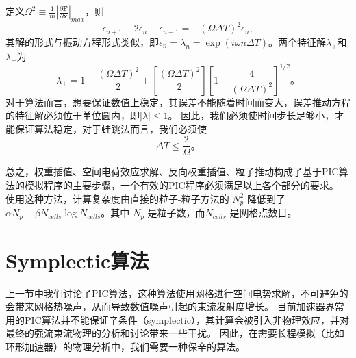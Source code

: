 {\begin{equation}
      \end{equation}
定义$\Omega^2 \equiv \frac{1}{m} \left| \frac{\partial\mathbf{F}}{\partial\mathbf{x}}\right|_{max} $，则
      \begin{equation}
         {\epsilon}_{n+1}-2{\epsilon}_n+{\epsilon}_{n-1} = -(\Omega \Delta T)^2 {\epsilon}_n,
         \label{eq:leapfrog_stabilit12}
      \end{equation}
其解的形式与振动方程形式类似，即${\epsilon}_n = {\lambda}_n = \exp(i\omega n \Delta T)$。两个特征解${\lambda}_+$和${\lambda}_-$为
      \begin{equation}
         \label{eq:leapfrog_stabilit13}
         {\lambda}_\pm = 1- \frac{(\Omega \Delta T)^2}{2}\pm \left[\frac{(\Omega \Delta T)^2}{2}\right]\left[1-\frac{4}{(\Omega \Delta T)^2}\right]^{1/2}\text{。}
      \end{equation}
对于算法而言，想要保证数值上稳定，其误差不能随着时间而变大，误差推动方程的特征解必须位于单位圆内，即$|\lambda| \leq 1$。
因此，我们必须使时间步长足够小，才能保证算法稳定，对于蛙跳法而言，我们必须使
      \begin{equation}
          \Delta T \leq \frac{2}{\Omega}\text{。}
      \end{equation}

总之，权重插值、空间电荷效应求解、反向权重插值、粒子推动构成了基于PIC算法的模拟程序的主要步骤，一个有效的PIC程序必须满足以上各个部分的要求。
使用这种方法，计算复杂度由直接的粒子-粒子方法的 $N_p^2$ 降低到了$\alpha N_p + \beta N_{cells}\log{N_{cells}}$。其中 $N_p$ 是粒子数，而$N_{cells}$ 是网格点数目。

\section{Symplectic算法}          \label{section:symplectic_theory}
上一节中我们讨论了PIC算法，这种算法使用网格进行空间电势求解，不可避免的会带来网格热噪声，从而导致数值噪声引起的束流发射度增长。
目前加速器界常用的PIC算法并不能保证辛条件（symplectic），其计算会被引入非物理效应，并对最终的强流束流物理的分析和讨论带来一些干扰。
因此，在需要长程模拟（比如环形加速器）的物理分析中，我们需要一种保辛的算法。

}
